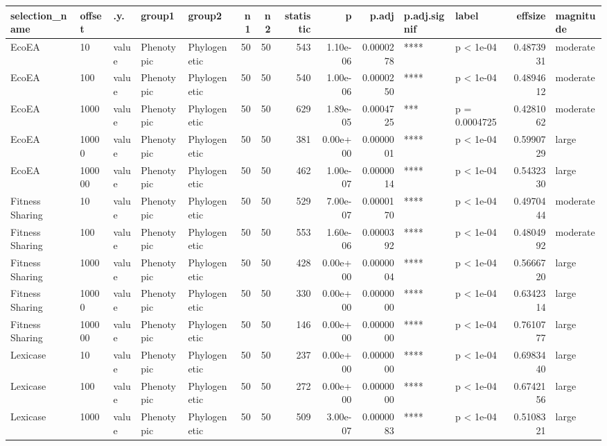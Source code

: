 \documentclass[]{book}
\begin{document}
\begin{table}
\centering
\begin{tabular}[t]{l|l|l|l|l|r|r|r|r|r|l|l|r|l}
\hline
selection\_name & offset & .y. & group1 & group2 & n1 & n2 & statistic & p & p.adj & p.adj.signif & label & effsize & magnitude\\
\hline
EcoEA & 10 & value & Phenotypic & Phylogenetic & 50 & 50 & 543 & 1.10e-06 & 0.0000278 & **** & p < 1e-04 & 0.4873931 & moderate\\
\hline
EcoEA & 100 & value & Phenotypic & Phylogenetic & 50 & 50 & 540 & 1.00e-06 & 0.0000250 & **** & p < 1e-04 & 0.4894612 & moderate\\
\hline
EcoEA & 1000 & value & Phenotypic & Phylogenetic & 50 & 50 & 629 & 1.89e-05 & 0.0004725 & *** & p = 0.0004725 & 0.4281062 & moderate\\
\hline
EcoEA & 10000 & value & Phenotypic & Phylogenetic & 50 & 50 & 381 & 0.00e+00 & 0.0000001 & **** & p < 1e-04 & 0.5990729 & large\\
\hline
EcoEA & 100000 & value & Phenotypic & Phylogenetic & 50 & 50 & 462 & 1.00e-07 & 0.0000014 & **** & p < 1e-04 & 0.5432330 & large\\
\hline
Fitness Sharing & 10 & value & Phenotypic & Phylogenetic & 50 & 50 & 529 & 7.00e-07 & 0.0000170 & **** & p < 1e-04 & 0.4970444 & moderate\\
\hline
Fitness Sharing & 100 & value & Phenotypic & Phylogenetic & 50 & 50 & 553 & 1.60e-06 & 0.0000392 & **** & p < 1e-04 & 0.4804992 & moderate\\
\hline
Fitness Sharing & 1000 & value & Phenotypic & Phylogenetic & 50 & 50 & 428 & 0.00e+00 & 0.0000004 & **** & p < 1e-04 & 0.5666720 & large\\
\hline
Fitness Sharing & 10000 & value & Phenotypic & Phylogenetic & 50 & 50 & 330 & 0.00e+00 & 0.0000000 & **** & p < 1e-04 & 0.6342314 & large\\
\hline
Fitness Sharing & 100000 & value & Phenotypic & Phylogenetic & 50 & 50 & 146 & 0.00e+00 & 0.0000000 & **** & p < 1e-04 & 0.7610777 & large\\
\hline
Lexicase & 10 & value & Phenotypic & Phylogenetic & 50 & 50 & 237 & 0.00e+00 & 0.0000000 & **** & p < 1e-04 & 0.6983440 & large\\
\hline
Lexicase & 100 & value & Phenotypic & Phylogenetic & 50 & 50 & 272 & 0.00e+00 & 0.0000000 & **** & p < 1e-04 & 0.6742156 & large\\
\hline
Lexicase & 1000 & value & Phenotypic & Phylogenetic & 50 & 50 & 509 & 3.00e-07 & 0.0000083 & **** & p < 1e-04 & 0.5108321 & large\\

\end{tabular}
\end{table}
\end{document}
